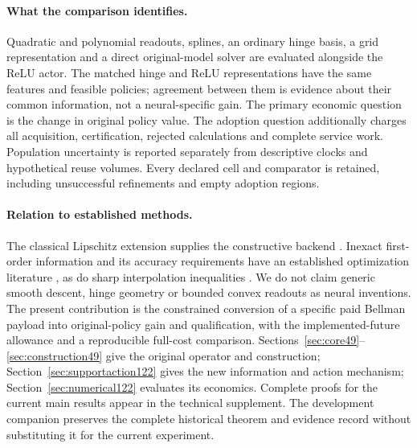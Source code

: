 \paragraph{What the comparison identifies.}
Quadratic and polynomial readouts, splines, an ordinary hinge basis, a grid
representation and a direct original-model solver are evaluated alongside the
ReLU actor. The matched hinge and ReLU representations have the same features
and feasible policies; agreement between them is evidence about their common
information, not a neural-specific gain. The primary economic question is the
change in original policy value. The adoption question additionally charges
all acquisition, certification, rejected calculations and complete service
work. Population uncertainty is reported separately from descriptive clocks
and hypothetical reuse volumes. Every declared cell and comparator is retained,
including unsuccessful refinements and empty adoption regions.

\paragraph{Relation to established methods.}
The classical Lipschitz extension supplies the constructive backend
\citep{mcshane1934}. Inexact first-order information and its accuracy requirements
have an established optimization literature \citep{DGN2014Inexact122}, as do
sharp interpolation inequalities \citep{THG2017Interpolation122}. We do not
claim generic smooth descent, hinge geometry or bounded convex readouts as
neural inventions. The present contribution is the constrained conversion of a
specific paid Bellman payload into original-policy gain and qualification,
with the implemented-future allowance and a reproducible full-cost comparison.
Sections~\ref{sec:core49}--\ref{sec:construction49} give the original operator
and construction; Section~\ref{sec:supportaction122} gives the new information
and action mechanism; Section~\ref{sec:numerical122} evaluates its economics.
Complete proofs for the current main results appear in the technical supplement.
The development companion
preserves the complete historical theorem and evidence record without
substituting it for the current experiment.
